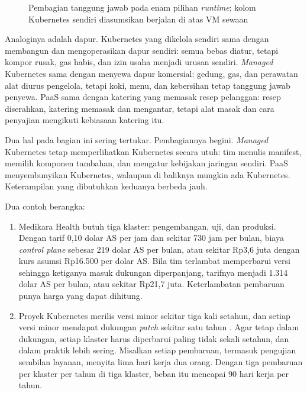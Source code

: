 \begin{figure}[!htb]
  \centering
  
  \caption{Pembagian tanggung jawab pada enam pilihan \textit{runtime}; kolom Kubernetes sendiri
           diasumsikan berjalan di atas VM sewaan}
  \label{fig:ch08-spektrum}
\end{figure}

Analoginya adalah dapur. Kubernetes yang dikelola sendiri sama dengan membangun dan mengoperasikan
dapur sendiri: semua bebas diatur, tetapi kompor rusak, gas habis, dan izin usaha menjadi urusan
sendiri. \textit{Managed} Kubernetes sama dengan menyewa dapur komersial: gedung, gas, dan
perawatan alat diurus pengelola, tetapi koki, menu, dan kebersihan tetap tanggung jawab penyewa.
PaaS sama dengan katering yang memasak resep pelanggan: resep diserahkan, katering memasak dan
mengantar, tetapi alat masak dan cara penyajian mengikuti kebiasaan katering itu.

Dua hal pada bagian ini sering tertukar. Pembagiannya begini. \textit{Managed} Kubernetes tetap
memperlihatkan Kubernetes secara utuh: tim menulis manifest, memilih komponen tambahan, dan
mengatur kebijakan jaringan sendiri. PaaS menyembunyikan Kubernetes, walaupun di baliknya mungkin
ada Kubernetes. Keterampilan yang dibutuhkan keduanya berbeda jauh.

Dua contoh berangka:
\begin{enumerate}
  \item Medikara Health butuh tiga klaster: pengembangan, uji, dan produksi. Dengan tarif 0,10
        dolar AS per jam dan sekitar 730 jam per bulan, biaya \textit{control plane} sebesar 219
        dolar AS per bulan, atau sekitar Rp3,6 juta dengan kurs asumsi Rp16.500 per dolar AS.
        Bila tim terlambat memperbarui versi sehingga ketiganya masuk dukungan diperpanjang,
        tarifnya menjadi 1.314 dolar AS per bulan, atau sekitar Rp21,7 juta. Keterlambatan
        pembaruan punya harga yang dapat dihitung.
  \item Proyek Kubernetes merilis versi minor sekitar tiga kali setahun, dan setiap versi minor
        mendapat dukungan \textit{patch} sekitar satu tahun \cite{c08-k8s-releases}. Agar tetap
        dalam dukungan, setiap klaster harus diperbarui paling tidak sekali setahun, dan dalam
        praktik lebih sering. Misalkan setiap pembaruan, termasuk pengujian sembilan layanan,
        menyita lima hari kerja dua orang. Dengan tiga pembaruan per klaster per tahun di tiga
        klaster, beban itu mencapai 90 hari kerja per tahun.
\end{enumerate}

